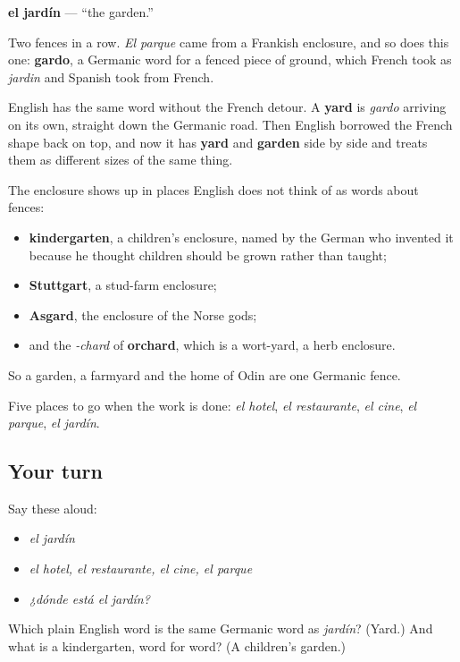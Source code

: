 \begin{cousinweb}
\textbf{el jardín} — \textquotedblleft{}the garden.\textquotedblright{}

Two fences in a row. \emph{El parque} came from a Frankish enclosure, and so does this one: \textbf{gardo}, a Germanic word for a fenced piece of ground, which French took as \emph{jardin} and Spanish took from French.

English has the same word without the French detour. A \textbf{yard} is \emph{gardo} arriving on its own, straight down the Germanic road. Then English borrowed the French shape back on top, and now it has \textbf{yard} and \textbf{garden} side by side and treats them as different sizes of the same thing.

The enclosure shows up in places English does not think of as words about fences:

\begin{itemize}
\raggedright
  \item \textbf{kindergarten}, a children's enclosure, named by the German who invented it because he thought children should be grown rather than taught;
  \item \textbf{Stuttgart}, a stud-farm enclosure;
  \item \textbf{Asgard}, the enclosure of the Norse gods;
  \item and the \emph{-chard} of \textbf{orchard}, which is a wort-yard, a herb enclosure.
\end{itemize}

So a garden, a farmyard and the home of Odin are one Germanic fence.
\end{cousinweb}

\begin{grammarlens}[title={What you've built}]
Five places to go when the work is done: \emph{el hotel}, \emph{el restaurante}, \emph{el cine}, \emph{el parque}, \emph{el jardín}.
\end{grammarlens}

\subsection*{Your turn}
Say these aloud:

\begin{itemize}
\raggedright
  \item \emph{el jardín}
  \item \emph{el hotel, el restaurante, el cine, el parque}
  \item \emph{¿dónde está el jardín?}
\end{itemize}

\begin{tcolorbox}[breakable,colback=teal!4,colframe=teal!35!black,title={Before you move on}]
Which plain English word is the same Germanic word as \emph{jardín}? (Yard.) And what is a kindergarten, word for word? (A children's garden.)
\end{tcolorbox}
